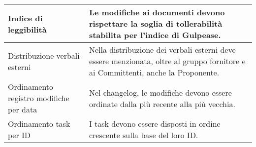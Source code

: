 \begin{adjustwidth}{-0.5cm}{-0.5cm}
\begin{longtable}{|P{4.5cm}|>{\raggedright\arraybackslash}P{9cm}|}
    \hline Indice di leggibilità & Le modifiche ai documenti devono rispettare la soglia di tollerabilità stabilita per l'indice di Gulpease.\\
    \hline Distribuzione verbali esterni & Nella distribuzione dei verbali esterni deve essere menzionata, oltre al gruppo fornitore e ai Committenti, anche la Proponente.\\
    \hline Ordinamento registro modifiche per data & Nel changelog, le modifiche devono essere ordinate dalla più recente alla più vecchia.\\
    \hline Ordinamento task per ID & I task devono essere disposti in ordine crescente sulla base del loro ID. \\
  \end{longtable}
\end{adjustwidth}
\egroup


